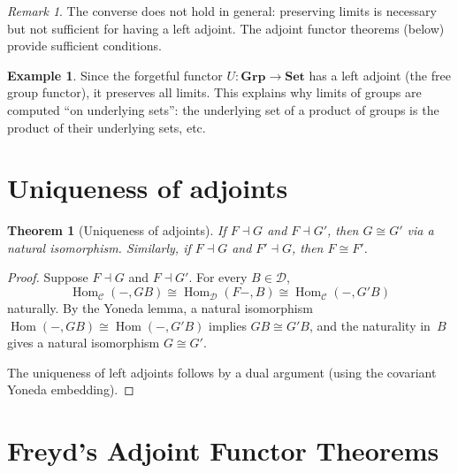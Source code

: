 \documentclass[a4paper,12pt]{book}
\DeclareMathOperator{\Hom}{Hom}
\newcommand{\Set}{\mathbf{Set}}
\newcommand{\Grp}{\mathbf{Grp}}
\theoremstyle{definition}
\newtheorem{example}[definition]{Example}
\theoremstyle{plain}
\newtheorem{theorem}[definition]{Theorem}
\theoremstyle{remark}
\newtheorem{remark}[definition]{Remark}
\begin{document}
\begin{remark}\label{rem:converse-not-true}
The converse does not hold in general: preserving limits is necessary
but not sufficient for having a left adjoint.  The adjoint functor
theorems (below) provide sufficient conditions.
\end{remark}

\begin{example}\label{ex:forgetful-preserves-limits}
Since the forgetful functor $U\colon\Grp\to\Set$ has a left adjoint
(the free group functor), it preserves all limits.  This explains why
limits of groups are computed ``on underlying sets'':
the underlying set of a product of groups is the product of their
underlying sets, etc.
\end{example}


\section{Uniqueness of adjoints}\label{sec:adj-unique}

\begin{theorem}[Uniqueness of adjoints]\label{thm:adj-unique}
If $F\dashv G$ and $F\dashv G'$, then $G\cong G'$ via a natural
isomorphism.  Similarly, if $F\dashv G$ and $F'\dashv G$, then
$F\cong F'$.
\end{theorem}

\begin{proof}
Suppose $F\dashv G$ and $F\dashv G'$.  For every $B\in\mathcal{D}$,
\[
    \Hom_\mathcal{C}(-,GB)
    \cong \Hom_\mathcal{D}(F-,B)
    \cong \Hom_\mathcal{C}(-,G'B)
\]
naturally.  By the Yoneda lemma, a natural isomorphism
$\Hom(-,GB)\cong\Hom(-,G'B)$ implies $GB\cong G'B$,
and the naturality in~$B$ gives a natural isomorphism $G\cong G'$.

The uniqueness of left adjoints follows by a dual argument
(using the covariant Yoneda embedding).
\end{proof}


\section{Freyd's Adjoint Functor Theorems}\label{sec:GAFT}
\end{document}
